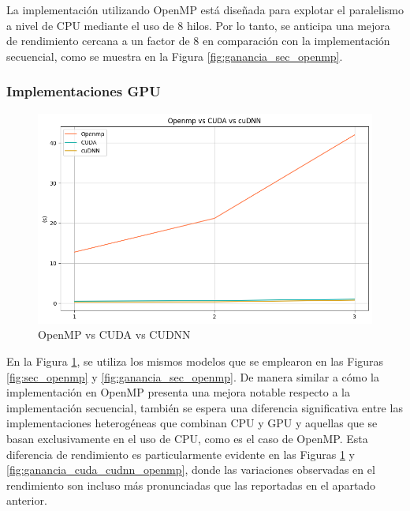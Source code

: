 La implementación utilizando OpenMP está diseñada para explotar el paralelismo a nivel de CPU mediante el uso de 8 hilos. Por lo tanto, se anticipa una mejora de rendimiento cercana a un factor de 8 en comparación con la implementación secuencial, como se muestra en la Figura \ref{fig:ganancia_sec_openmp}.

\vspace{10mm}

\subsubsection{Implementaciones GPU}

\begin{figure}[H]
	\centering
	\includegraphics[scale=0.52]{imagenes/openmp_cuda_cudnn.png}  
	\caption{OpenMP vs CUDA vs CUDNN}
	\label{fig:openmp_cuda_cudnn}
\end{figure}

En la Figura \ref{fig:openmp_cuda_cudnn}, se utiliza los mismos modelos que se emplearon en las Figuras \ref{fig:sec_openmp} y \ref{fig:ganancia_sec_openmp}.
De manera similar a cómo la implementación en OpenMP presenta una mejora notable respecto a la implementación secuencial, también se espera una diferencia significativa entre las implementaciones heterogéneas que combinan CPU y GPU  y aquellas que se basan exclusivamente en el uso de CPU, como es el caso de OpenMP. Esta diferencia de rendimiento es particularmente evidente en las Figuras \ref{fig:openmp_cuda_cudnn} y \ref{fig:ganancia_cuda_cudnn_openmp}, donde las variaciones observadas en el rendimiento son incluso más pronunciadas que las reportadas en el apartado anterior.

